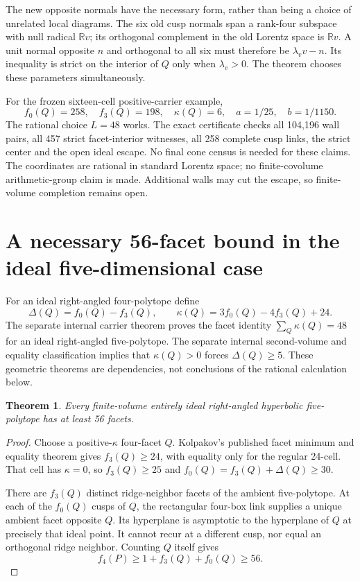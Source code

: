 \documentclass[11pt]{article}
\newtheorem{theorem}{Theorem}
\begin{document}
The new opposite normals have the necessary form, rather than being a
choice of unrelated local diagrams. The six old cusp normals span a
rank-four subspace with null radical $\mathbb Rv$; its orthogonal
complement in the old Lorentz space is $\mathbb Rv$. A unit normal
opposite $n$ and orthogonal to all six must therefore be
$\lambda_vv-n$. Its inequality is strict on the interior of $Q$ only
when $\lambda_v>0$. The theorem chooses these parameters simultaneously.

For the frozen sixteen-cell positive-carrier example,
\[
 f_0(Q)=258,\quad f_3(Q)=198,\quad \kappa(Q)=6,
 \quad a=1/25,\quad b=1/1150.
\]
The rational choice $L=48$ works. The exact certificate checks all
104,196 wall pairs, all 457 strict facet-interior witnesses, all 258
complete cusp links, the strict center and the open ideal escape.
No final cone census is needed for these claims. The coordinates are
rational in standard Lorentz space; no finite-covolume arithmetic-group
claim is made. Additional walls may cut the escape, so finite-volume
completion remains open.

\section{A necessary 56-facet bound in the ideal five-dimensional case}
For an ideal right-angled four-polytope define
\[
 \Delta(Q)=f_0(Q)-f_3(Q),\qquad
 \kappa(Q)=3f_0(Q)-4f_3(Q)+24.
\]
The separate internal carrier theorem proves the facet identity
$\sum_Q\kappa(Q)=48$ for an ideal right-angled five-polytope. The separate
internal second-volume and equality classification implies that
$\kappa(Q)>0$ forces $\Delta(Q)\ge5$. These geometric theorems are
dependencies, not conclusions of the rational calculation below.

\begin{theorem}
Every finite-volume entirely ideal right-angled hyperbolic five-polytope
has at least 56 facets.
\end{theorem}
\begin{proof}
Choose a positive-$\kappa$ four-facet $Q$. Kolpakov's published facet
minimum and equality theorem \cite{Kolpakov} gives $f_3(Q)\ge24$, with
equality only for the regular 24-cell. That cell has $\kappa=0$, so
$f_3(Q)\ge25$ and $f_0(Q)=f_3(Q)+\Delta(Q)\ge30$.

There are $f_3(Q)$ distinct ridge-neighbor facets of the ambient
five-polytope. At each of the $f_0(Q)$ cusps of $Q$, the rectangular
four-box link supplies a unique ambient facet opposite $Q$.
Its hyperplane is asymptotic to the hyperplane of $Q$ at precisely that
ideal point. It cannot recur at a different cusp, nor equal an orthogonal
ridge neighbor. Counting $Q$ itself gives
\[
 f_4(P)\ge1+f_3(Q)+f_0(Q)\ge56.
\]
\end{proof}
\end{document}

